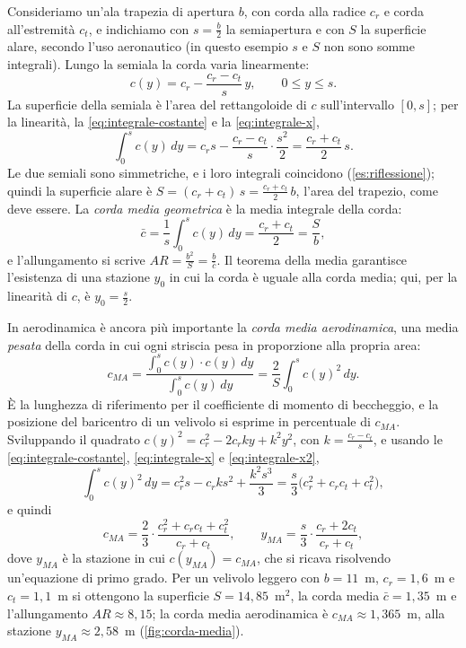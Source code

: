 \begin{esempio}\label{es:corda-media}
Consideriamo un'ala trapezia di apertura $b$, con corda alla radice $c_{r}$ e corda
all'estremità $c_{t}$, e indichiamo con $s=\frac b2$ la semiapertura e con $S$ la
superficie alare, secondo l'uso aeronautico (in questo esempio $s$ e $S$ non sono somme
integrali). Lungo la semiala
la corda varia linearmente:
\begin{equation}\label{eq:corda-trapezia}
  c(y)=c_{r}-\frac{c_{r}-c_{t}}s\,y, \qquad 0\le y\le s .
\end{equation}
La superficie della semiala è l'area del rettangoloide di $c$ sull'intervallo $[0,s]$;
per la linearità, la \eqref{eq:integrale-costante} e la \eqref{eq:integrale-x},
\[
  \int_{0}^{s}c(y)\,dy=c_{r}s-\frac{c_{r}-c_{t}}s\cdot\frac{s^{2}}2=\frac{c_{r}+c_{t}}2\,s .
\]
Le due semiali sono simmetriche, e i loro integrali coincidono
(\cref{es:riflessione}); quindi la superficie alare è
$S=(c_{r}+c_{t})\,s=\frac{c_{r}+c_{t}}2\,b$, l'area del trapezio, come deve essere.
La \emph{corda media geometrica} è la media integrale della corda:
\begin{equation}\label{eq:corda-media}
  \bar c=\frac1s\int_{0}^{s}c(y)\,dy=\frac{c_{r}+c_{t}}2=\frac Sb ,
\end{equation}
e l'allungamento si scrive $AR=\frac{b^{2}}S=\frac b{\bar c}$. Il teorema della media
garantisce l'esistenza di una stazione $y_{0}$ in cui la corda è uguale alla corda
media; qui, per la linearità di $c$, è $y_{0}=\frac s2$.

In aerodinamica è ancora più importante la \emph{corda media aerodinamica}, una media
\emph{pesata} della corda in cui ogni striscia pesa in proporzione alla propria area:
\[
  c_{MA}=\frac{\int_{0}^{s}c(y)\cdot c(y)\,dy}{\int_{0}^{s}c(y)\,dy}
  =\frac2S\int_{0}^{s}c(y)^{2}\,dy .
\]
È la lunghezza di riferimento per il coefficiente di momento di beccheggio, e la
posizione del baricentro di un velivolo si esprime in percentuale di $c_{MA}$.
Sviluppando il quadrato $c(y)^{2}=c_{r}^{2}-2c_{r}ky+k^{2}y^{2}$, con
$k=\frac{c_{r}-c_{t}}s$, e usando le \eqref{eq:integrale-costante}, \eqref{eq:integrale-x}
e \eqref{eq:integrale-x2},
\[
  \int_{0}^{s}c(y)^{2}\,dy=c_{r}^{2}s-c_{r}ks^{2}+\frac{k^{2}s^{3}}3
  =\frac s3\bigl(c_{r}^{2}+c_{r}c_{t}+c_{t}^{2}\bigr),
\]
e quindi
\begin{equation}\label{eq:corda-media-aerodinamica}
  c_{MA}=\frac23\cdot\frac{c_{r}^{2}+c_{r}c_{t}+c_{t}^{2}}{c_{r}+c_{t}} ,
  \qquad
  y_{MA}=\frac s3\cdot\frac{c_{r}+2c_{t}}{c_{r}+c_{t}} ,
\end{equation}
dove $y_{MA}$ è la stazione in cui $c(y_{MA})=c_{MA}$, che si ricava risolvendo
un'equazione di primo grado. Per un velivolo leggero con $b=11$~m, $c_{r}=1{,}6$~m e
$c_{t}=1{,}1$~m si ottengono la superficie $S=14{,}85$~m$^{2}$, la corda media
$\bar c=1{,}35$~m e l'allungamento $AR\approx8{,}15$; la corda media aerodinamica è
$c_{MA}\approx1{,}365$~m, alla stazione $y_{MA}\approx2{,}58$~m
(\cref{fig:corda-media}).
\end{esempio}

